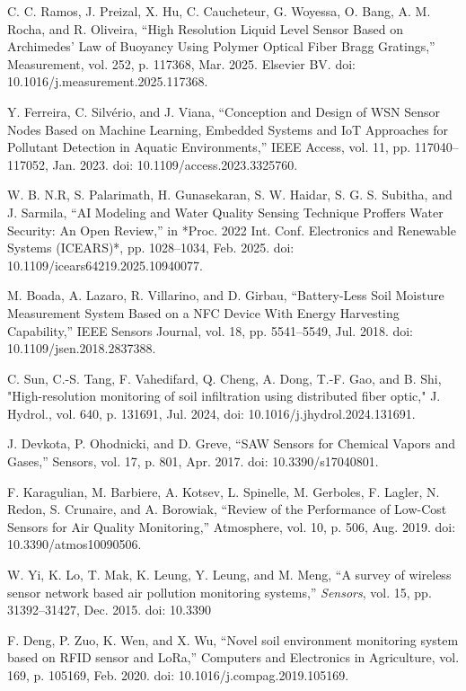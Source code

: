 \begin{thebibliography}{00}
 C. C. Ramos, J. Preizal, X. Hu, C. Caucheteur, G. Woyessa, O. Bang, A. M. Rocha, and R. Oliveira, 
``High Resolution Liquid Level Sensor Based on Archimedes’ Law of Buoyancy Using Polymer Optical Fiber Bragg Gratings,'' 
Measurement, vol. 252, p. 117368, Mar. 2025. Elsevier BV. doi: 10.1016/j.measurement.2025.117368.

 Y. Ferreira, C. Silvério, and J. Viana, 
``Conception and Design of WSN Sensor Nodes Based on Machine Learning, Embedded Systems and IoT Approaches for Pollutant Detection in Aquatic Environments,'' 
IEEE Access, vol. 11, pp. 117040--117052, Jan. 2023. doi: 10.1109/access.2023.3325760.

 W. B. N.R, S. Palarimath, H. Gunasekaran, S. W. Haidar, S. G. S. Subitha, and J. Sarmila, 
``AI Modeling and Water Quality Sensing Technique Proffers Water Security: An Open Review,'' 
in *Proc. 2022 Int. Conf. Electronics and Renewable Systems (ICEARS)*, pp. 1028--1034, Feb. 2025. doi: 10.1109/icears64219.2025.10940077.

 M. Boada, A. Lazaro, R. Villarino, and D. Girbau, 
``Battery-Less Soil Moisture Measurement System Based on a NFC Device With Energy Harvesting Capability,'' 
IEEE Sensors Journal, vol. 18, pp. 5541--5549, Jul. 2018. 
doi: 10.1109/jsen.2018.2837388.

 C. Sun, C.-S. Tang, F. Vahedifard, Q. Cheng, A. Dong, T.-F. Gao, and B. Shi, "High-resolution monitoring of soil infiltration using distributed fiber optic," J. Hydrol., vol. 640, p. 131691, Jul. 2024, doi: 10.1016/j.jhydrol.2024.131691.

 J. Devkota, P. Ohodnicki, and D. Greve, 
``SAW Sensors for Chemical Vapors and Gases,'' 
Sensors, vol. 17, p. 801, Apr. 2017. 
doi: 10.3390/s17040801.

 F. Karagulian, M. Barbiere, A. Kotsev, L. Spinelle, M. Gerboles, F. Lagler, N. Redon, S. Crunaire, and A. Borowiak, 
``Review of the Performance of Low-Cost Sensors for Air Quality Monitoring,'' 
Atmosphere, vol. 10, p. 506, Aug. 2019. doi: 10.3390/atmos10090506.

 W. Yi, K. Lo, T. Mak, K. Leung, Y. Leung, and M. Meng, ``A survey of wireless sensor network based air pollution monitoring systems,'' \emph{Sensors}, vol. 15, pp. 31392--31427, Dec. 2015. doi: 10.3390

 F. Deng, P. Zuo, K. Wen, and X. Wu, 
``Novel soil environment monitoring system based on RFID sensor and LoRa,'' 
Computers and Electronics in Agriculture, vol. 169, p. 105169, Feb. 2020. doi: 10.1016/j.compag.2019.105169.


\end{thebibliography}
